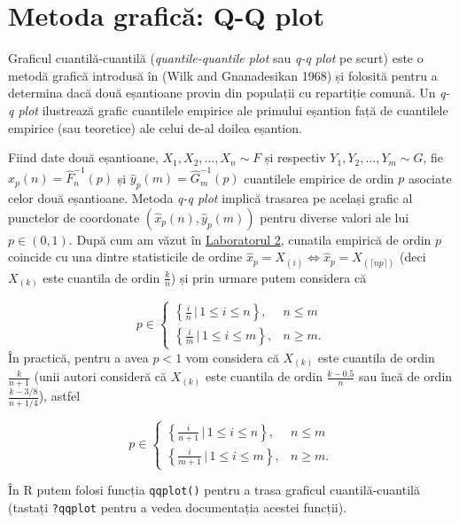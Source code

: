 \documentclass[]{article}
\begin{document}
\section{Metoda grafică: Q-Q plot}\label{metoda-grafica-q-q-plot}

Graficul cuantilă-cuantilă (\emph{quantile-quantile plot} sau \emph{q-q
plot} pe scurt) este o metodă grafică introdusă în (Wilk and
Gnanadesikan 1968) și folosită pentru a determina dacă două eșantioane
provin din populații cu repartiție comună. Un \emph{q-q plot} ilustrează
grafic cuantilele empirice ale primului eșantion față de cuantilele
empirice (sau teoretice) ale celui de-al doilea eșantion.

Fiind date două eșantioane, \(X_1,X_2,\ldots,X_n\sim F\) și respectiv
\(Y_1, Y_2, \ldots, Y_m\sim G\), fie
\(\hat{x}_p(n) = \hat{F}_n^{-1}(p)\) și
\(\hat{y}_p(m) = \hat{G}_m^{-1}(p)\) cuantilele empirice de ordin \(p\)
asociate celor două eșantioane. Metoda \emph{q-q plot} implică trasarea
pe același grafic al punctelor de coordonate
\((\hat{x}_p(n), \hat{y}_p(m))\) pentru diverse valori ale lui
\(p\in(0,1)\). După cum am văzut în
\href{https://alexamarioarei.github.io/Teaching/2017-2018/Biostat\%20web\%20page/labs/Lab_2.html}{Laboratorul
2}, cunatila empirică de ordin \(p\) coincide cu una dintre statisticile
de ordine
\(\hat{x}_p = X_{(i)} \iff \hat{x}_p = X_{(\lceil np \rceil)}\) (deci
\(X_{(k)}\) este cuantila de ordin \(\frac{k}{n}\)) și prin urmare putem
considera că

\[
    p\in \left\{\begin{array}{ll}
      \left\{\frac{i}{n}\,|\,1\leq i\leq n\right\}, & n\leq m\\
      \left\{\frac{i}{m}\,|\,1\leq i\leq m\right\}, & n\geq m.
    \end{array}\right.
  \] În practică, pentru a avea \(p<1\) vom considera că \(X_{(k)}\)
este cuantila de ordin \(\frac{k}{n+1}\) (unii autori consideră că
\(X_{(k)}\) este cuantila de ordin \(\frac{k-0.5}{n}\) sau încă de ordin
\(\frac{k-3/8}{n+1/4}\)), astfel

\[
    p\in \left\{\begin{array}{ll}
      \left\{\frac{i}{n+1}\,|\,1\leq i\leq n\right\}, & n\leq m\\
      \left\{\frac{i}{m+1}\,|\,1\leq i\leq m\right\}, & n\geq m.
    \end{array}\right.
  \]

În R putem folosi funcția \texttt{qqplot()} pentru a trasa graficul
cuantilă-cuantilă (tastați \texttt{?qqplot} pentru a vedea documentația
acestei funcții).
\end{document}
